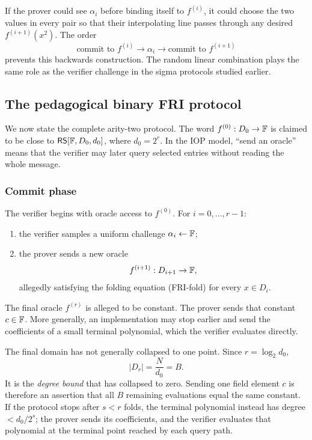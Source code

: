 \begin{intuitionbox}[title=\textbf{Why the challenge comes after the current oracle}]
If the prover could see $\alpha_i$ before binding itself to $f^{(i)}$, it could choose the two
values in every pair so that their interpolating line passes through any desired
$f^{(i+1)}(x^2)$. The order
\[
    \text{commit to }f^{(i)}
    \longrightarrow \alpha_i
    \longrightarrow \text{commit to }f^{(i+1)}
\]
prevents this backwards construction. The random linear combination plays the same role as
the verifier challenge in the sigma protocols studied earlier.
\end{intuitionbox}

\subsection{The pedagogical binary FRI protocol}

We now state the complete arity-two protocol. The word $f^{(0)}:D_0\to\mathbb{F}$ is claimed to be
close to $\mathsf{RS}[\mathbb{F},D_0,d_0]$, where $d_0=2^r$. In the IOP model, ``send an oracle'' means
that the verifier may later query selected entries without reading the whole message.

\subsubsection*{Commit phase}

The verifier begins with oracle access to $f^{(0)}$. For $i=0,\ldots,r-1$:
\begin{enumerate}[leftmargin=2em]
    \item the verifier samples a uniform challenge $\alpha_i\leftarrow\mathbb{F}$;
    \item the prover sends a new oracle
    \[
        f^{(i+1)}:D_{i+1}\to\mathbb{F},
    \]
    allegedly satisfying the folding equation (FRI-fold) for every $x\in D_i$.
\end{enumerate}
The final oracle $f^{(r)}$ is alleged to be constant. The prover sends that constant
$c\in\mathbb{F}$. More generally, an implementation may stop earlier and send the coefficients of a
small terminal polynomial, which the verifier evaluates directly.

The final domain has not generally collapsed to one point. Since $r=\log_2d_0$,
\[
    |D_r|=\frac{N}{d_0}=B.
\]
It is the \emph{degree bound} that has collapsed to zero. Sending one field element $c$ is
therefore an assertion that all $B$ remaining evaluations equal the same constant. If the
protocol stops after $s<r$ folds, the terminal polynomial instead has degree
$<d_0/2^s$; the prover sends its coefficients, and the verifier evaluates that polynomial at
the terminal point reached by each query path.

